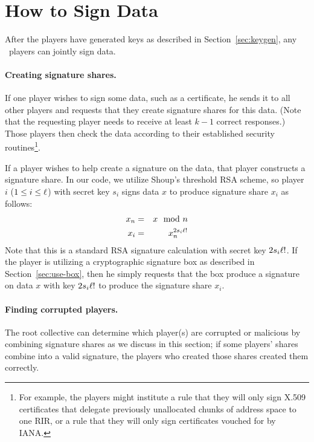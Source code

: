\section{How to Sign Data}
\label{sec:how-sign}

After the players have generated keys as described in
Section~\ref{sec:keygen}, any \nums\ players can jointly sign data.

\paragraph{Creating signature shares.}
If one player wishes to sign some data, such as a certificate, he
sends it to all other players and requests that they create signature shares for this data. 
(Note that the requesting player needs to receive at least $k-1$ correct responses.) Those players then check the data according to their established security routines\footnote{For example, the players might institute a
rule that they will only sign X.509 certificates that delegate previously unallocated chunks of address space to one RIR, or a rule that they will only sign certificates vouched for by IANA.}.


If a player wishes to help create a signature on the data, that player constructs a signature
share. In our code, we utilize Shoup's threshold RSA scheme, so player
$i$ ($1 \leq i \leq \ell$) with secret key $s_i$ signs data $x$ to
produce signature share $x_i$ as follows:
\begin{eqnarray*}
x_n & = & x \mod n \\
x_i & = & x_n^{2 s_i \ell!}
\end{eqnarray*}
Note that this is a standard RSA signature calculation with secret key
$2s_i \ell!$. If the player is utilizing a cryptographic signature
box as described in Section~\ref{sec:use-box}, then he simply requests
that the box produce a signature on data $x$ with key $2 s_i \ell!$ to
produce the signature share $x_i$.

\paragraph{Finding corrupted players.}
The root collective can determine which player(s) are corrupted or
malicious by combining signature shares as we discuss in this section;
if some players' shares combine into a valid signature, the players who
created those shares created them correctly.

